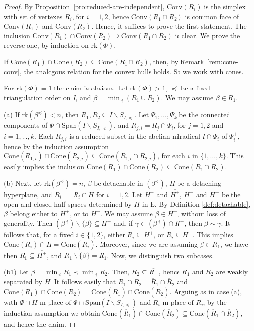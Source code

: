\documentclass[ALCO,published]{cedram}
\theoremstyle{plain}
\newcommand\nl{\par\noindent}
\newcommand\ov{\overline}
\newcommand\smeno{\smallsetminus}
\newcommand\conv{\mathrm{Conv}}
\newcommand\cone{\mathrm{Cone}}
\newcommand\gen{\mathrm{Span}}
\newcommand\rk{\mathrm{rk}}
\newcommand\be{\beta}
\newcommand\ga{\gamma}
\newcommand\preq{\preccurlyeq}
\begin{document}
\begin{proof}
By Proposition~\ref{pro:reduced-are-independent}, $\conv(R_i)$ is the simplex with set of vertexes $R_i$, for $i=1,2$, hence  $\conv(R_1\cap R_2)$ is common face of  $\conv(R_1)$ and $\conv(R_2)$. 
Hence, it suffices to prove the first statement.
The inclusion $\conv(R_1)\cap\conv(R_2)\supseteq \conv(R_1\cap R_2)$ is clear. 
We prove the reverse one, by induction on $\rk(\Phi)$. 

\par
If $\cone(R_1)\cap\cone(R_2)\subseteq \cone(R_1\cap R_2)$, then, by Remark~\ref{rem:cone-conv}, the analogous relation for the convex hulls holds. 
So we work with cones.

\par
For $\rk(\Phi)=1$ the claim is obvious. 
Let  $\rk(\Phi)>1$, $\preq$ be a fixed triangulation order on $I$,  and $\be=\min_\preq(R_1\cup R_2)$. 
We may assume $\be\in R_1$.

\par
 (a) If $\rk(\be^\preq)< n$, then $R_1, R_2\subseteq I\smeno S_{I, \preq}$. 
Let $\Psi_1, \dots, \Psi_k$ be the connected components of $\Phi\cap \gen(I\smeno S_{I, \preq})$,
and $R_{j,i}=R_j\cap \Psi_i$, for $j=1,2$ and $i=1, \dots, k$. 
Each $R_{j,i}$ is a reduced subset in the abelian nilradical $I\cap \Psi_i$ of $\Psi_i^+$, hence by the induction assumption $\cone(R_{1,i})\cap\cone(R_{2,i})\subseteq \cone(R_{1,i}\cap R_{2,i})$, 
for each $i$ in $\{1,\dots,k\}$. 
This easily implies the inclusion $\cone(R_1)\cap\cone(R_2)\subseteq \cone(R_1\cap R_2)$. 

(b) Next, let  $\rk(\be^\preq)=n$,  $\be$ be detachable in  $(\be^\preq)$, $H$ be a detaching hyperplane, and $\ov R_i=$ $R_i\cap H$ for $i=1,2$.
Let $H^+$ and $\ov{H^+}$,  $H^-$ and $\ov{H^-}$ be the open and closed half spaces determined by $H$ in $\mathrm E$. 
By Definition \ref{def:detachable}, $\be$ belong either to $H^+$, or to $H^-$. 
We may assume $\be\in H^+$, without loss of generality. 
Then $(\be^\preq)\smeno\{\be\}\subseteq \ov{H^-}$ and, if $\ga\in(\be^\preq)\cap H^-$, then $\be\sim \ga$. 
It follows that, for a fixed $i\in \{1, 2\}$, either $R_i\subseteq \ov{H^+}$,  or $R_i\subseteq \ov{H^-}$.
This implies  $\cone(R_i)\cap H=\cone(\ov R_i)$. 
Moreover, since we are assuming $\be\in R_1$, we have 
then $R_1\subseteq \ov{H^+}$, and $R_1\smeno\{\be\}=\ov R_1$.
Now, we distinguish two subcases.

(b1) Let $\be=\min_\preq R_1\prec \min_\preq R_{2}$.
Then,  $R_2\subseteq \ov {H^-}$, hence $R_1$ and $R_2$ are weakly separated by $H$. 
It follows easily that  $R_1\cap R_2=\ov R_1\cap \ov R_2$ and $\cone(R_1)\cap\cone(R_2)=\cone(\ov R_1)\cap\cone(\ov R_2)$. 
Arguing as in case (a), with $\Phi\cap H$ in place of  $\Phi\cap \gen(I\smeno S_{I, \preq})$ and $\ov R_i$ in place of $R_i$, by the induction assumption we obtain $\cone(\ov R_1)\cap\cone(\ov R_2)\subseteq\cone (\ov R_1\cap \ov R_2)$, 
and hence the claim.


\end{proof}
\end{document}
